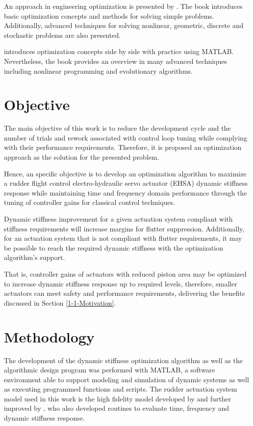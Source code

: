 An approach in engineering optimization is presented by . The book introduces basic optimization concepts and methods for solving simple problems. Additionally, advanced techniques for solving nonlinear, geometric, discrete and stochastic problems are also presented.

 introduces optimization concepts side by side with practice using MATLAB. Nevertheless, the book provides an overview in many advanced techniques including nonlinear programming and evolutionary algorithms. \nocite{OptToolbox} \nocite{IdtToolbox} 

\section{Objective}

The main objective of this work is to reduce the development cycle and the number of trials and rework associated with control loop tuning while complying with their performance requirements. Therefore, it is proposed an optimization approach as the solution for the presented problem.

Hence, an specific objective is to develop an optimization algorithm to maximize a rudder flight control electro-hydraulic servo actuator (EHSA) dynamic stiffness response while maintaining time and frequency domain performance through the tuning of controller gains for classical control techniques.

Dynamic stiffness improvement for a given actuation system compliant with stiffness requirements will increase margins for flutter suppression. Additionally, for an actuation system that is not compliant with flutter requirements, it may be possible to reach the required dynamic stiffness with the optimization algorithm's support. 

That is, controller gains of actuators with reduced piston area may be optimized to increase dynamic stiffness response up to required levels, therefore, smaller actuators can meet safety and performance requirements, delivering the benefits discussed in Section \ref{1-1-Motivation}.

\section{Methodology}

The development of the dynamic stiffness optimization algorithm as well as the algorithmic design program was performed with MATLAB, a software environment able to support modeling and simulation of dynamic systems as well as executing programmed functions and scripts. The rudder actuation system model used in this work is the high fidelity model developed by  and further improved by , who also developed routines to evaluate time, frequency and dynamic stiffness response. 

